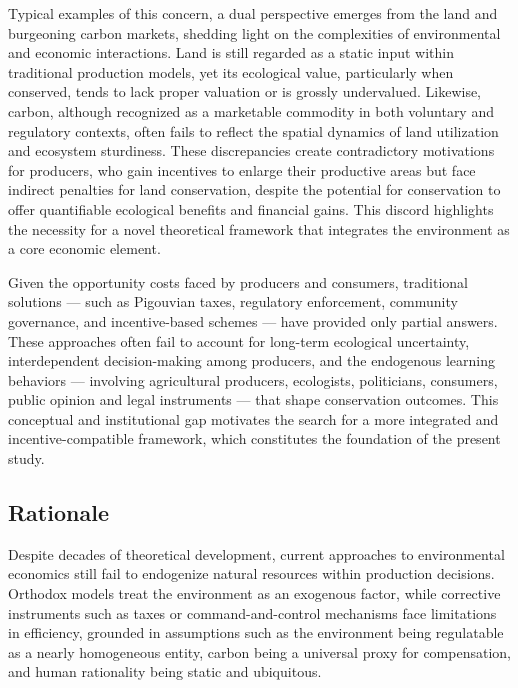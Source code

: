 Typical examples of this concern, a dual perspective emerges from the land and burgeoning carbon markets, shedding light on the complexities of environmental and economic interactions. Land is still regarded as a static input within traditional production models, yet its ecological value, particularly when conserved, tends to lack proper valuation or is grossly undervalued. Likewise, carbon, although recognized as a marketable commodity in both voluntary and regulatory contexts, often fails to reflect the spatial dynamics of land utilization and ecosystem sturdiness. These discrepancies create contradictory motivations for producers, who gain incentives to enlarge their productive areas but face indirect penalties for land conservation, despite the potential for conservation to offer quantifiable ecological benefits and financial gains. This discord highlights the necessity for a novel theoretical framework that integrates the environment as a core economic element.

Given the opportunity costs faced by producers and consumers, traditional solutions — such as Pigouvian taxes, regulatory enforcement, community governance, and incentive-based schemes — have provided only partial answers. These approaches often fail to account for long-term ecological uncertainty, interdependent decision-making among producers, and the endogenous learning behaviors — involving agricultural producers, ecologists, politicians, consumers, public opinion and legal instruments — that shape conservation outcomes. This conceptual and institutional gap motivates the search for a more integrated and incentive-compatible framework, which constitutes the foundation of the present study.

\subsection{Rationale}

Despite decades of theoretical development, current approaches to environmental economics still fail to endogenize natural resources within production decisions. Orthodox models treat the environment as an exogenous factor, while corrective instruments such as taxes or command-and-control mechanisms face limitations in efficiency, grounded in assumptions such as the environment being regulatable as a nearly homogeneous entity, carbon being a universal proxy for compensation, and human rationality being static and ubiquitous. 


